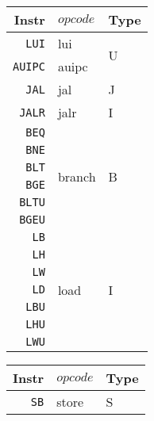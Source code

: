 \begin{table}
    \centering
    \begin{tabular}[t]{r|l|l}
        \hline
        Instr          & $opcode$                & Type               \\
        \hline
        \texttt{LUI}   & lui                     & \multirow{2}{*}{U} \\
        \texttt{AUIPC} & auipc                   &                    \\
        \hline
        \texttt{JAL}   & jal                     & J                  \\
        \texttt{JALR}  & jalr                    & I                  \\
        \hline
        \texttt{BEQ}   & \multirow{6}{*}{branch} & \multirow{6}{*}{B} \\
        \texttt{BNE}   &                         &                    \\
        \texttt{BLT}   &                         &                    \\
        \texttt{BGE}   &                         &                    \\
        \texttt{BLTU}  &                         &                    \\
        \texttt{BGEU}  &                         &                    \\
        \hline
        \texttt{LB}    & \multirow{7}{*}{load}   & \multirow{7}{*}{I} \\
        \texttt{LH}    &                                              \\
        \texttt{LW}    &                                              \\
        \texttt{LD}    &                                              \\
        \texttt{LBU}   &                                              \\
        \texttt{LHU}   &                                              \\
        \texttt{LWU}   &                                              \\
        \hline
    \end{tabular}
    \begin{tabular}[t]{r|l|l}
        \hline
        Instr          & $opcode$                   & Type                 \\
        \hline
        \texttt{SB}    & \multirow{4}{*}{store}     & \multirow{4}{*}{S}   \\

\end{tabular}
\end{table}
